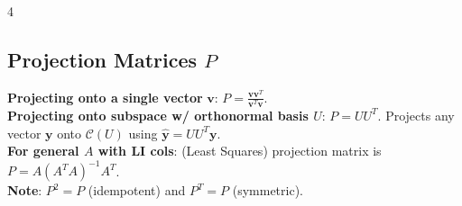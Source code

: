 \documentclass[9pt]{extarticle}
\begin{document}
\begin{multicols*}{4}

\subsection*{Projection Matrices $P$}
\textbf{Projecting onto a single vector} $\mathbf{v}$: $P=\frac{\mathbf{v}\mathbf{v}^{T}}{\mathbf{v}^{T}\mathbf{v}}$.\\
\textbf{Projecting onto subspace w/ orthonormal basis $U$}: $P=UU^{T}$. Projects any vector $\mathbf{y}$ onto $\mathcal{C}(U)$ using $\hat{\mathbf{y}}=UU^{T}\mathbf{y}$.\\
\textbf{For general $A$ with LI cols}: (Least Squares) projection matrix is $P=A(A^{T}A)^{-1}A^{T}$.\\
\textbf{Note}: $P^2=P$ (idempotent) and $P^T=P$ (symmetric).


\end{multicols*}
\end{document}
